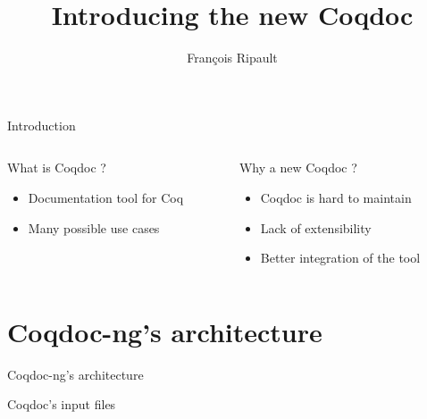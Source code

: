 \documentclass[compress]{beamer}
\title{Introducing the new Coqdoc}
\author{François Ripault}
\begin{document}
\begin{frame}
\titlepage
\end{frame}

\begin{frame}{Introduction}
  \begin{columns}[2]
    \begin{column}{0.5\textwidth}
      What is Coqdoc ?
      \begin{itemize}
        \item Documentation tool for Coq
        \item Many possible use cases
      \end{itemize}
    \end{column}
    \begin{column}{0.5\textwidth}
      Why a new Coqdoc ?
      \begin{itemize}
        \item Coqdoc is hard to maintain
        \item Lack of extensibility
        \item Better integration of the tool
      \end{itemize}
    \end{column}
  \end{columns}
\end{frame}

\begin{frame}
    \tableofcontents
\end{frame}

\section{Coqdoc-ng's architecture}
  \begin{frame}{Coqdoc-ng's architecture}
    
  \end{frame}
  \begin{frame}[containsverbatim]{Coqdoc's input files}
    
    \end{frame}
\end{document}
